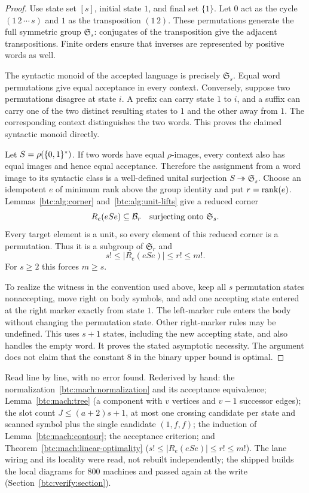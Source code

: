 \begin{proof}
Use state set $[s]$, initial state $1$, and final set $\{1\}$. Let
$0$ act as the cycle $(1\,2\,\cdots\,s)$ and $1$ as the
transposition $(1\,2)$. These permutations generate the full symmetric
group $\mathfrak S_s$: conjugates of the transposition give the adjacent
transpositions. Finite orders ensure that inverses are represented by
positive words as well.

The syntactic monoid of the accepted language is precisely
$\mathfrak S_s$. Equal word permutations give equal acceptance in every
context. Conversely, suppose two permutations disagree at state $i$.
A prefix can carry state $1$ to $i$, and a suffix can carry one of the
two distinct resulting states to $1$ and the other away from $1$.
The corresponding context distinguishes the two words. This proves the
claimed syntactic monoid directly.

Let $S=\rho(\{0,1\}^*)$. If two words have equal $\rho$-images, every
context also has equal images and hence equal acceptance. Therefore the
assignment from a word image to its syntactic class is a well-defined
unital surjection $S\twoheadrightarrow\mathfrak S_s$.
Choose an idempotent $e$ of minimum rank above the group identity and
put $r=\operatorname{rank}(e)$. Lemmas~\ref{btc:alg:corner} and~\ref{btc:alg:unit-lifts}
give a reduced corner
\[
 R_e(eSe)\subseteq\mathcal{B}_{r}
 \quad\text{surjecting onto }\mathfrak S_s.
\]
Every target element is a unit, so every element of this reduced corner
is a permutation. Thus it is a subgroup of $\mathfrak S_r$ and
\[
 s!\le |R_e(eSe)|\le r!\le m!.
\]
For $s\ge2$ this forces $m\ge s$.

To realize the witness in the convention used above, keep all $s$
permutation states nonaccepting, move right on body symbols, and add
one accepting state entered at the right marker exactly from state $1$.
The left-marker rule enters the body without changing the permutation
state. Other right-marker rules may be undefined. This uses $s+1$
states, including the new accepting state, and also handles the empty
word. It proves the stated asymptotic necessity. The argument does not
claim that the constant $8$ in the binary upper bound is optimal.
\end{proof}

\begin{writenote}
Read line by line, with no error found. Rederived by hand: the
normalization~\eqref{btc:mach:normalization} and its acceptance equivalence;
Lemma~\ref{btc:mach:tree} (a component with $v$ vertices and $v-1$ successor
edges); the slot count $J\le(a+2)s+1$, at most one crossing candidate per
state and scanned symbol plus the single candidate $(1,f,f)$; the induction
of Lemma~\ref{btc:mach:contour}; the acceptance criterion; and
Theorem~\ref{btc:mach:linear-optimality} ($s!\le|R_e(eSe)|\le r!\le m!$).
The lane wiring and its locality were read, not rebuilt independently; the
shipped  builds the local diagrams for 800
machines and passed again at the write (Section~\ref{btc:verify:section}).
\end{writenote}
